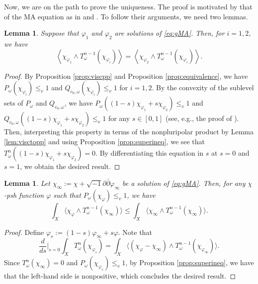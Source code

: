 \documentclass{amsart}
\numberwithin{equation}{section}
\theoremstyle{plain}
\newtheorem{lem}[equation]{Lemma}
\theoremstyle{definition}
\theoremstyle{remark}
\newcommand{\delb}{\sqrt{-1}\partial\bar{\partial}}
\begin{document}
Now, we are on the path to prove the uniqueness. The proof is motivated by that of the MA equation as in \cite[Section 3]{BEGZ} and \cite{Dinew}. To follow their arguments, we need two lemmas.

\begin{lem}\label{lem:uni}
     Suppose that $\varphi_1$ and $\varphi_2$ are solutions of \eqref{eq:gMA}. Then, for $i=1,2$, we have
     $$\left\langle\chi_{\varphi_1}\wedge T^{n-1}_\omega(\chi_{\varphi_i})\right\rangle=\left\langle\chi_{\varphi_2}\wedge T^{n-1}_\omega(\chi_{\varphi_i})\right\rangle.$$
\end{lem}

\begin{proof}
    By Proposition \ref{prop:viscpp} and Proposition \ref{prop:equivalence}, we have $P_\omega(\chi_{\varphi_i})\le_v1$ and $Q_{c_0,\omega}(\chi_{\varphi_i})\le_v 1$ for $i=1,2$. By the convexity of the sublevel sets of $P_\omega$ and $Q_{c_0,\omega}$, we have $P_\omega((1-s)\chi_{\varphi_1}+s\chi_{\varphi_2})\le_v 1$ and $Q_{c_0,\omega}((1-s)\chi_{\varphi_1}+s\chi_{\varphi_2})\le_v 1$ for any $s\in[0,1]$ (see, e.g., the proof of \cite[Theorem 5.8]{CC}). Then, interpreting this property in terms of the nonpluripolar product by Lemma \ref{lem:visctopp} and using Proposition \ref{prop:superineq}, we see that 
    $T^n_\omega((1-s)\chi_{\varphi_1}+s\chi_{\varphi_2})=0$. By differentiating this equation in $s$ at $s=0$ and $s=1$, we obtain the desired result.
\end{proof}

\begin{lem}\label{lem:solineq}
    Let $\chi_\infty:=\chi+\delb\varphi_\infty$ be a solution of \eqref{eq:gMA}. Then, for any $\chi$-psh function $\varphi$ such that $P_\omega(\chi_\varphi)\le_v 1$, we have
    $$\int_X\big\langle\chi_\varphi\wedge T^{n-1}_\omega(\chi_\infty)\big\rangle\le \int_X\big\langle \chi_\infty\wedge T^{n-1}_\omega(\chi_\infty)\big\rangle.$$
\end{lem}

\begin{proof}
    Define $\varphi_s:=(1-s)\varphi_\infty+s\varphi$. Note that
    \begin{equation*}
        \frac{d}{ds}\Bigg\vert_{s=0}\int_X T^n_\omega(\chi_{\varphi_s})=\int_X \big\langle(\chi_\varphi-\chi_\infty)\wedge T^{n-1}_\omega(\chi_{\varphi_\infty})\big\rangle.
    \end{equation*}
    Since $T^n_\omega(\chi_\infty)=0$ and $P_{\omega}(\chi_{\varphi_s})\le_v1$, by Proposition \ref{prop:superineq}, we have that the left-hand side is nonpositive, which concludes the desired result.
\end{proof}
\end{document}
